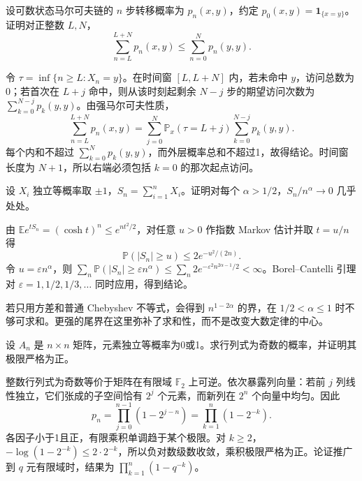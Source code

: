 \documentclass[UTF8,12pt,a4paper,fontset=fandol]{ctexbook}
\newcommand{\E}{\mathbb E}
\newcommand{\PP}{\mathbb P}
\begin{document}
\begin{example}[原题2：马尔可夫链的访问概率和]\label{yau:2021-2}
设可数状态马尔可夫链的 $n$ 步转移概率为 $p_n(x,y)$，约定 $p_0(x,y)=\mathbf1_{\{x=y\}}$。证明对正整数 $L,N$，
\[
\sum_{n=L}^{L+N}p_n(x,y)\le\sum_{n=0}^Np_n(y,y).
\]
\end{example}
\begin{solve}
令 $\tau=\inf\{n\ge L:X_n=y\}$。在时间窗 $[L,L+N]$ 内，若未命中 $y$，访问总数为0；若首次在 $L+j$ 命中，则从该时刻起剩余 $N-j$ 步的期望访问次数为 $\sum_{k=0}^{N-j}p_k(y,y)$。由强马尔可夫性质，
\[
\sum_{n=L}^{L+N}p_n(x,y)=\sum_{j=0}^N\PP_x(\tau=L+j)\sum_{k=0}^{N-j}p_k(y,y).
\]
每个内和不超过 $\sum_{k=0}^Np_k(y,y)$，而外层概率总和不超过1，故得结论。时间窗长度为 $N+1$，所以右端必须包括 $k=0$ 的那次起点访问。
\end{solve}

\begin{example}[原题3：随机符号和的几乎处处增长率]\label{yau:2021-3}
设 $X_i$ 独立等概率取 $\pm1$，$S_n=\sum_{i=1}^nX_i$。证明对每个 $\alpha>1/2$，$S_n/n^\alpha\to0$ 几乎处处。
\end{example}
\begin{solve}
由 $\E e^{tS_n}=(\cosh t)^n\le e^{nt^2/2}$，对任意 $u>0$ 作指数 Markov 估计并取 $t=u/n$ 得
\[
\PP(|S_n|\ge u)\le2e^{-u^2/(2n)}.
\]
令 $u=\varepsilon n^\alpha$，则 $\sum_n\PP(|S_n|\ge\varepsilon n^\alpha)\le\sum_n2e^{-\varepsilon^2n^{2\alpha-1}/2}<\infty$。Borel--Cantelli 引理对 $\varepsilon=1,1/2,1/3,\ldots$ 同时应用，得到结论。

若只用方差和普通 Chebyshev 不等式，会得到 $n^{1-2\alpha}$ 的界，在 $1/2<\alpha\le1$ 时不够可求和。更强的尾界在这里弥补了求和性，而不是改变大数定律的中心。
\end{solve}

\begin{example}[原题4：随机零一矩阵行列式的奇偶性]\label{yau:2021-4}
设 $A_n$ 是 $n\times n$ 矩阵，元素独立等概率为0或1。求行列式为奇数的概率，并证明其极限严格为正。
\end{example}
\begin{solve}
整数行列式为奇数等价于矩阵在有限域 $\mathbb F_2$ 上可逆。依次暴露列向量：若前 $j$ 列线性独立，它们张成的子空间恰有 $2^j$ 个元素，而新列在 $2^n$ 个向量中均匀。因此
\[
p_n=\prod_{j=0}^{n-1}(1-2^{j-n})=\prod_{k=1}^n(1-2^{-k}).
\]
各因子小于1且正，有限乘积单调趋于某个极限。对 $k\ge2$，$-\log(1-2^{-k})\le2\cdot2^{-k}$，所以负对数级数收敛，乘积极限严格为正。论证推广到 $q$ 元有限域时，结果为 $\prod_{k=1}^n(1-q^{-k})$。
\end{solve}
\end{document}
